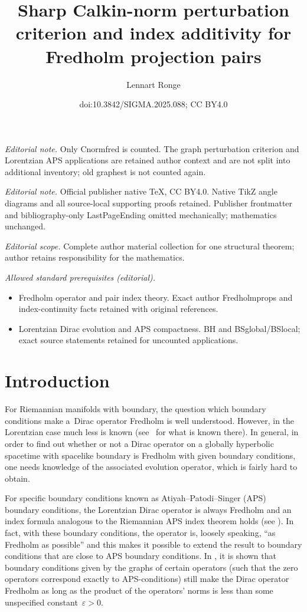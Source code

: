 \documentclass[10pt,a4paper]{amsart}
\title{Sharp Calkin-norm perturbation criterion and index additivity for Fredholm projection pairs}
\author{Lennart Ronge}
\date{doi:10.3842/SIGMA.2025.088; CC BY4.0}
\numberwithin{equation}{section}
\begin{document}
\maketitle
\noindent\textit{Editorial note.} Only Cnormfred is counted. The graph perturbation criterion and Lorentzian APS applications are retained author context and are not split into additional inventory; old graphest is not counted again.\par\medskip
\noindent\textit{Editorial note.} Official publisher native TeX, CC BY4.0. Native TikZ angle diagrams and all source-local supporting proofs retained. Publisher frontmatter and bibliography-only LastPageEnding omitted mechanically; mathematics unchanged.\par\medskip
\noindent\textit{Editorial scope.} Complete author material collection for one structural theorem; author retains responsibility for the mathematics.\par\medskip
\noindent\textit{Allowed standard prerequisites (editorial).}\begin{itemize}
\item Fredholm operator and pair index theory. Exact author Fredholmprops and index-continuity facts retained with original references.
\item Lorentzian Dirac evolution and APS compactness. BH and BSglobal/BSlocal; exact source statements retained for uncounted applications.
\end{itemize}\medskip
	\section{Introduction}
For Riemannian manifolds with boundary, the question which boundary conditions make a~Dirac operator Fredholm is well understood. However, in the Lorentzian case much less is known (see~\cite{BH} for what is known there). In general,  in order to find out whether or not a Dirac operator on a globally hyperbolic spacetime with spacelike boundary is Fredholm with given boundary conditions, one needs knowledge of the associated evolution operator, which is fairly hard to obtain.
	
For specific boundary conditions known as Atiyah--Patodi--Singer (APS) boundary conditions, the Lorentzian Dirac operator is always Fredholm and an index formula analogous to the Riemannian APS index theorem holds (see \cite{BSglobal,BSlocal}). In fact, with these boundary conditions, the operator is, loosely speaking, ``as Fredholm as possible'' and this makes it possible to extend the result to boundary conditions that are close to APS boundary conditions. In \cite[Proposition~4.5]{BH}, it is shown that boundary conditions given by the graphs of certain operators (such that the zero operators correspond exactly to APS-conditions) still make the Dirac operator Fredholm as long as the product of the operators' norms is less than some unspecified constant~${\varepsilon>0}$.
	
\end{document}
